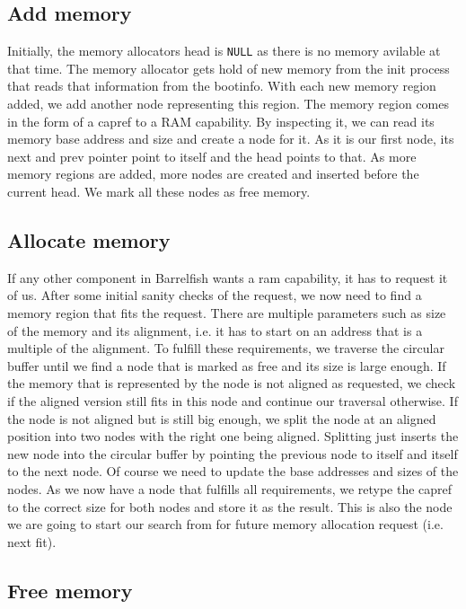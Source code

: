 \subsection{Add memory}

Initially, the memory allocators head is \texttt{NULL} as there is no memory avilable at that
time. The memory allocator gets hold of new memory from the init
process that reads that information from the bootinfo. With each new memory
region added, we add another node representing this region. The memory region
comes in the form of a capref to a RAM capability. By inspecting it, we can read
its memory base address and size and create a node for it. As it is our first node,
its next and prev pointer point to itself and the head points to that.  As more
memory regions are added, more nodes are created and inserted before the current
head. We mark all these nodes as free memory.

\subsection{Allocate memory}

If any other component in Barrelfish wants a ram capability, it has to request it of us.
After some initial sanity checks of the request, we now need to find a memory
region that fits the request. There are multiple parameters such as size of the
memory and its alignment, i.e. it has to start on an address that is a multiple of
the alignment.  To fulfill these requirements, we traverse the circular buffer
until we find a node that is marked as free and its size is large enough. If the
memory that is represented by the node is not aligned as requested, we check if
the aligned version still fits in this node and continue our traversal
otherwise. If the node is not aligned but is still big enough, we split the
node at an aligned position into two nodes with the right one being aligned.
Splitting just inserts the new node into the circular buffer by pointing the
previous node to itself and itself to the next node. Of course we need to update
the base addresses and sizes of the nodes.  As we now have a node that fulfills
all requirements, we retype the capref to the correct size for both nodes and
store it as the result.  This is also the node we are going to start our
search from for future memory allocation request (i.e. next fit).

\subsection{Free memory}

